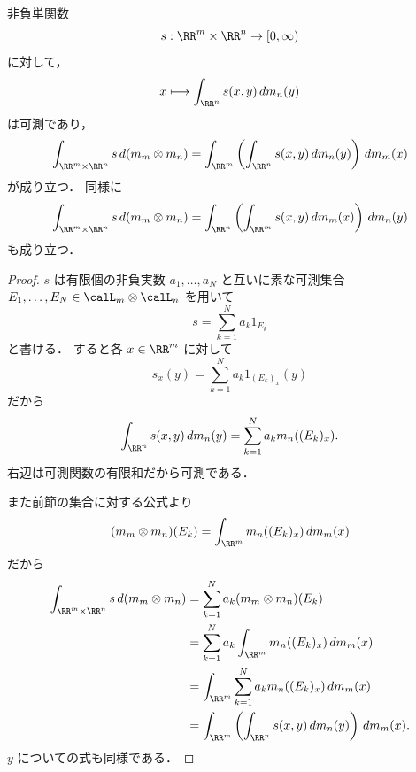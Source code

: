 \begin{theorem}[単関数に対するTonelli]
非負単関数
\[
s:\RR^m\times\RR^n\to[0,\infty)
\]
に対して，
\[
x\longmapsto \int_{\RR^n}s(x,y)\,dm_n(y)
\]
は可測であり，
\[
\int_{\RR^m\times\RR^n}s\,d(m_m\otimes m_n)
=
\int_{\RR^m}\left(\int_{\RR^n}s(x,y)\,dm_n(y)\right)\,dm_m(x)
\]
が成り立つ．
同様に
\[
\int_{\RR^m\times\RR^n}s\,d(m_m\otimes m_n)
=
\int_{\RR^n}\left(\int_{\RR^m}s(x,y)\,dm_m(x)\right)\,dm_n(y)
\]
も成り立つ．
\end{theorem}
\begin{proof}
$s$ は有限個の非負実数 $a_1,\dots,a_N$ と互いに素な可測集合
$E_1,\dots,E_N\in\calL_m\otimes\calL_n$ を用いて
\[
s=\sum_{k=1}^N a_k1_{E_k}
\]
と書ける．
すると各 $x\in\RR^m$ に対して
\[
s_x(y)=\sum_{k=1}^N a_k1_{(E_k)_x}(y)
\]
だから
\[
\int_{\RR^n}s(x,y)\,dm_n(y)
=
\sum_{k=1}^N a_k m_n((E_k)_x).
\]
右辺は可測関数の有限和だから可測である．

また前節の集合に対する公式より
\[
(m_m\otimes m_n)(E_k)
=
\int_{\RR^m}m_n((E_k)_x)\,dm_m(x)
\]
だから
\begin{align*}
\int_{\RR^m\times\RR^n}s\,d(m_m\otimes m_n)
&=
\sum_{k=1}^N a_k(m_m\otimes m_n)(E_k) \\
&=
\sum_{k=1}^N a_k\int_{\RR^m}m_n((E_k)_x)\,dm_m(x) \\
&=
\int_{\RR^m}\sum_{k=1}^N a_km_n((E_k)_x)\,dm_m(x) \\
&=
\int_{\RR^m}\left(\int_{\RR^n}s(x,y)\,dm_n(y)\right)\,dm_m(x).
\end{align*}
$y$ についての式も同様である．
\end{proof}

